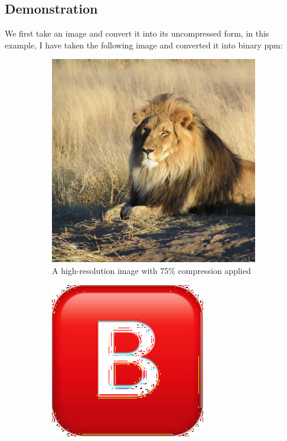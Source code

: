 \documentclass[12pt,technote]{IEEEtran}
\begin{document}
\subsection{Demonstration}
We first take an image and convert it into its uncompressed form, in this example, I have taken the following image and converted it into binary ppm:
\begin{figure}
    \centering
    \begin{subfigure}[m]{0.3\textwidth}
        \centering
        \includegraphics[width=\textwidth]{figures/lion_compressed.jpg}
        \caption{A high-resolution image with 75\% compression applied}
        \label{fig:lion}
    \end{subfigure}
    \hfill
    \begin{subfigure}[b]{0.3\textwidth}
        \centering
        \includegraphics[width=\textwidth]{figures/b_compressed.jpg}

\end{subfigure}
\end{figure}
\end{document}
